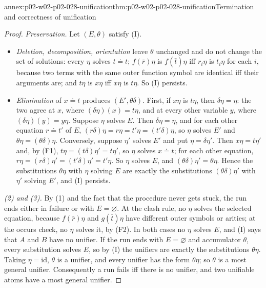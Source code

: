 \begin{annexitem}{annex:p02-w02-p02-028-unification}{thm:p02-w02-p02-028-unification}{Termination and correctness of unification}
\begin{proof}
\emph{Preservation.}  Let \((E,\theta)\) satisfy (I).
\begin{itemize}
  \item \emph{Deletion, decomposition, orientation} leave \(\theta\) unchanged
        and do not change the set of solutions: every \(\eta\) solves
        \(t\doteq t\); \(f(\bar r)\eta\) is \(f(\bar t)\eta\) iff
        \(r_i\eta\) is \(t_i\eta\) for each \(i\), because two terms with the
        same outer function symbol are identical iff their arguments are; and
        \(t\eta\) is \(x\eta\) iff \(x\eta\) is \(t\eta\).  So (I) persists.
  \item \emph{Elimination} of \(x\doteq t\) produces \((E',\theta\delta)\).
        First, if \(x\eta\) is \(t\eta\), then \(\delta\eta=\eta\): the two
        agree at \(x\), where \((\delta\eta)(x)=t\eta\), and at every other
        variable \(y\), where \((\delta\eta)(y)=y\eta\).  Suppose \(\eta\)
        solves \(E\).  Then \(\delta\eta=\eta\), and for each other equation
        \(r\doteq t'\) of \(E\), \((r\delta)\eta=r\eta=t'\eta=(t'\delta)\eta\),
        so \(\eta\) solves \(E'\) and \(\theta\eta=(\theta\delta)\eta\).
        Conversely, suppose \(\eta'\) solves \(E'\) and put
        \(\eta=\delta\eta'\).  Then \(x\eta=t\eta'\) and, by (F1),
        \(t\eta=(t\delta)\eta'=t\eta'\), so \(\eta\) solves \(x\doteq t\);
        for each other equation, \(r\eta=(r\delta)\eta'=(t'\delta)\eta'=t'\eta\).
        So \(\eta\) solves \(E\), and \((\theta\delta)\eta'=\theta\eta\).
        Hence the substitutions \(\theta\eta\) with \(\eta\) solving \(E\) are
        exactly the substitutions \((\theta\delta)\eta'\) with \(\eta'\)
        solving \(E'\), and (I) persists.
\end{itemize}

\emph{(2) and (3).}  By (1) and the fact that the procedure never gets
stuck, the run ends either in failure or with \(E=\varnothing\).  At the clash
rule, no \(\eta\) solves the selected equation, because
\(f(\bar r)\eta\) and \(g(\bar t)\eta\) have different outer symbols or
arities; at the occurs check, no \(\eta\) solves it, by (F2).  In both cases no
\(\eta\) solves \(E\), and (I) says that \(A\) and \(B\) have no unifier.  If
the run ends with \(E=\varnothing\) and accumulator \(\theta\), every
substitution solves \(E\), so by (I) the unifiers are exactly the
substitutions \(\theta\eta\).  Taking \(\eta=\mathrm{id}\), \(\theta\) is a
unifier, and every unifier has the form \(\theta\eta\); so \(\theta\) is a most
general unifier.  Consequently a run fails iff there is no unifier, and two
unifiable atoms have a most general unifier.
\end{proof}
\end{annexitem}

